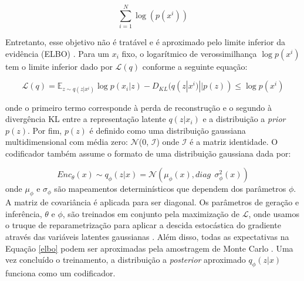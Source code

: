 \begin{equation}
\sum_{i=1}^N \log (p(x^i))
\end{equation}

Entretanto, esse objetivo não é tratável e é aproximado pelo limite inferior da evidência (ELBO) \cite{kingma2013auto}. Para um $x_i$ fixo, o logarítmico de verossimilhança $\log p(x^i)$ tem o limite inferior dado por $\mathcal{L}(q)$ conforme a seguinte equação:

\begin{equation}
\label{elbo}
\mathcal{L}(q) = \mathbb{E}_{z \sim q(z|x^i)} \log p(x_i|z) - D_{KL}(q(z|x^i)||p(z)) \leq \log p(x^i)
\end{equation}

onde o primeiro termo corresponde à perda de reconstrução e o segundo à divergência KL entre a representação latente $q(z|x_i)$ e a distribuição a \textit{prior} $p(z)$.
Por fim, $p(z)$ é definido como uma distribuição gaussiana multidimensional com média zero: $\mathcal{N}$(0, $\mathcal{I}$) onde $\mathcal{I}$ é a matriz identidade. O codificador também assume o formato de uma distribuição gaussiana dada por:

\begin{equation}
Enc_{\theta}(x) \sim q_{\phi}(z|x) = \mathcal{N}(\mu_{\phi}(x), diag\ \ \sigma_{\phi}^2(x))
\end{equation}
onde $\mu_{\phi}$ e $\sigma_{\phi}$ são mapeamentos determinísticos que dependem dos parâmetros $\phi$. A matriz de covariância é aplicada para ser diagonal. Os parâmetros de geração e inferência, $\theta$ e  $\phi$, são treinados em conjunto pela maximização de $\mathcal{L}$, onde usamos o truque de reparametrização para aplicar a descida estocástica do gradiente através das variáveis latentes gaussianas \cite{sonderby2016ladder}. Além disso, todas as expectativas na Equação \ref{elbo} podem ser aproximadas pela amostragem de Monte Carlo \cite{Goodfellow2016}.
Uma vez concluído o treinamento, a distribuição a \textit{posterior} aproximado $q_{\phi}(z|x)$ funciona como um codificador.





